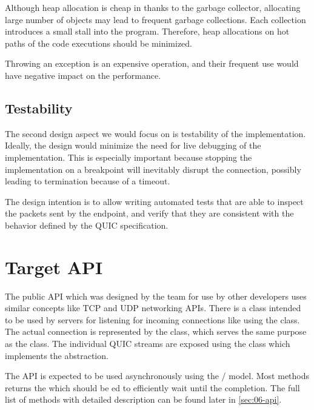 \begin{itemize}

     Although heap allocation is cheap in \dotnet{} thanks
    to the garbage collector, allocating large number of objects may lead to frequent garbage
    collections. Each collection introduces a small stall into the program. Therefore,
    heap allocations on hot paths of the code executions should be minimized.

     Throwing an exception is an expensive operation, and
    their frequent use would have negative impact on the performance.

\end{itemize}

\subsection{Testability}

The second design aspect we would focus on is testability of the implementation. Ideally, the design
would minimize the need for live debugging of the implementation. This is especially important
because stopping the implementation on a breakpoint will inevitably disrupt the connection, possibly
leading to termination because of a timeout.

The design intention is to allow writing automated tests that are able to inspect the packets sent
by the endpoint, and verify that they are consistent with the behavior defined by the QUIC
specification.

\section{Target \dotnet{} API}


The public API which was designed by the \dotnet{} team for use by other developers uses similar
concepts like TCP and UDP networking APIs. There is a \QuicListener{} class intended to be used by
servers for listening for incoming connections like using the  class. The actual
connection is represented by the \QuicConnection{} class, which serves the same purpose as the
 class. The individual QUIC streams are exposed using the \QuicStream{} class which
implements the  abstraction.

The API is expected to be used asynchronously using the / model. Most
methods returns the  which should be ed to efficiently wait until
the completion. The full list of methods with detailed description can be found later in
\autoref{sec:06-api}.

